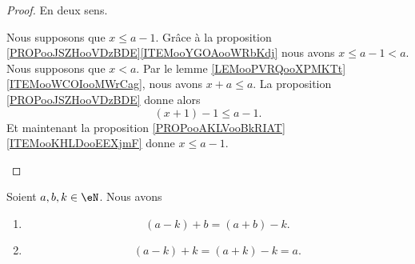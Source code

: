 \begin{proof}
	En deux sens.
	\begin{subproof}
		\spitem[\( \Rightarrow\)]
		Nous supposons que \( x\leq a-1\). Grâce à la proposition \ref{PROPooJSZHooVDzBDE}\ref{ITEMooYGOAooWRbKdj} nous avons \( x\leq a-1<a\).
		\spitem[\( \Leftarrow\)]
		Nous supposons que \( x<a\). Par le lemme \ref{LEMooPVRQooXPMKTt}\ref{ITEMooWCOIooMWrCag}, nous avons \( x+a\leq a\). La proposition \ref{PROPooJSZHooVDzBDE} donne alors
		\begin{equation}
			(x+1)-1\leq a-1.
		\end{equation}
		Et maintenant la proposition \ref{PROPooAKLVooBkRIAT}\ref{ITEMooKHLDooEEXjmF} donne \( x\leq a-1\).
	\end{subproof}
\end{proof}

\begin{proposition}	\label{PROPooAKLVooBkRIAT}
	Soient \( a,b,k\in \eN\). Nous avons
	\begin{enumerate}
		\item			\label{ITEMooFMQCooSjuCDV}
		      \begin{equation}
			      (a-k)+b=(a+b)-k.
		      \end{equation}
		\item		\label{ITEMooKHLDooEEXjmF}
		      \begin{equation}
			      (a-k)+k=(a+k)-k=a.
		      \end{equation}
	\end{enumerate}
\end{proposition}


